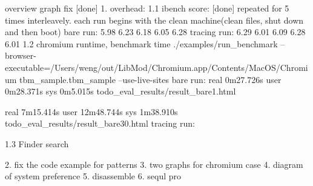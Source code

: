 overview graph fix [done]
1. overhead:
        1.1 ibench score: [done]
                repeated for 5 times interleavely.
                each run begins with the clean machine(clean files, shut down and then boot)
                  bare run: 5.98 6.23 6.18 6.05 6.28
               tracing run: 6.29 6.01 6.09 6.28 6.01
       1.2 chromium runtime, benchmark 
                time ./examples/run_benchmark --browser-executable=/Users/weng/out/LibMod/Chromium.app/Contents/MacOS/Chromium tbm_sample.tbm_sample --use-live-sites
                 bare run:
real	0m27.726s
user	0m28.371s
sys	0m5.015s
todo_eval_results/result_bare1.html

real	7m15.414s
user	12m48.744s
sys	1m38.910s
todo_eval_results/result_bare30.html
                tracing run:
                
        1.3 Finder search

2. fix the code example for patterns
3. two graphs for chromium case 
4. diagram of system preference
5. disassemble
6. sequl pro
   

